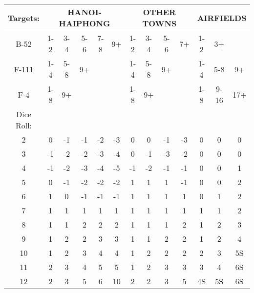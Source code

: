 
\newcommand{\targets}{\multicolumn{1}{l}{Targets:}}
\newcommand{\hanoi}{\multicolumn{5}{c}{HANOI-HAIPHONG}}
\newcommand{\other}{\multicolumn{4}{c}{OTHER TOWNS}}
\newcommand{\airfields}{\multicolumn{3}{c}{AIRFIELDS}}

{\ttfamily
\begin{tabular}{|c|ccccc|cccc|ccc|}
  \targets &  \hanoi  &  \other   &  \airfields\\\hline 
  B-52  & 1-2 & 3-4 & 5-6 & 7-8 & 9+ & 1-2 & 3-4 & 5-6 & 7+ & 1-2 & 3+   & \\
  F-111 & 1-4 & 5-8 & 9+  &     &    & 1-4 & 5-8 & 9+  &    & 1-4 & 5-8  & 9+ \\
  F-4   & 1-8 & 9+  &     &     &    & 1-8 & 9+  &     &    & 1-8 & 9-16 & 17+ \\\hline
  \makecell{Dice\\Roll: }& & & & & & & & & & & &  \\
  2 & 0  & -1 & -1 & -2 & -3 &  0 &  0 & -1 & -3 &  0 & 0 & 0 \\
  3 & -1 & -2 & -2 & -3 & -4 &  0 & -1 & -3 & -2 &  0 & 0 & 0 \\
  4 & -1 & -2 & -3 & -4 & -5 & -1 & -2 & -1 & -1 &  0 & 0 & 1 \\
  5 & 0  & -1 & -2 & -2 & -2 &  1 &  1 &  1 & -1 &  0 & 0 & 2 \\
  6 & 1  &  0 & -1 & -1 & -1 &  1 &  1 &  1 &  1 &  0 & 1 & 2 \\
  7 & 1  &  1 &  1 &  1 &  1 &  1 &  1 &  1 &  1 &  1 & 1 & 2 \\
  8 & 1  &  1 &  2 &  2 &  2 &  1 &  1 &  1 &  2 &  1 & 2 & 3 \\
  9 & 1  &  2 &  2 &  3 &  3 &  1 &  1 &  2 &  2 &  1 & 2 & 4 \\
  10 & 1 &  2 &  3 &  4 &  4 &  1 &  2 &  2 &  2 &  2 & 3 & 5S \\
  11 & 2 &  3 &  4 &  5 &  5 &  1 &  2 &  3 &  3 &  3 & 4 & 6S \\
  12 & 2 &  3 &  5 &  6 & 10 &  2 &  2 & 3  &  5 &  4S & 5S & 6S   \\\hline 
\end{tabular}
}

